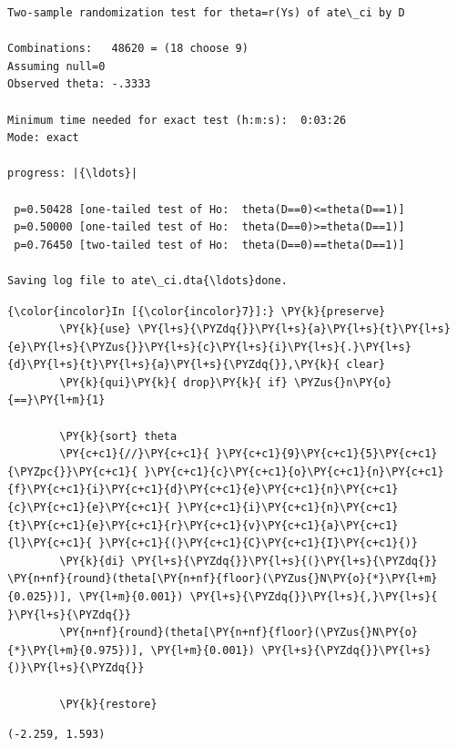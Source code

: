 \documentclass[11pt,notitlepage]{article}\usepackage[]{graphicx}\usepackage[]{color}
\makeatletter
\newenvironment{kframe}{%
 \def\at@end@of@kframe{}%
 \ifinner\ifhmode%
  \def\at@end@of@kframe{\end{minipage}}%
  \begin{minipage}{\columnwidth}%
 \fi\fi%
 \def\FrameCommand##1{\hskip\@totalleftmargin \hskip-\fboxsep
 \colorbox{shadecolor}{##1}\hskip-\fboxsep
     \hskip-\linewidth \hskip-\@totalleftmargin \hskip\columnwidth}%
 \MakeFramed {\advance\hsize-\width
   \@totalleftmargin\z@ \linewidth\hsize
   \@setminipage}}%
 {\par\unskip\endMakeFramed%
 \at@end@of@kframe}
\newenvironment{knitrout}{}{} %
\makeatother
\begin{document}
\begin{enumerate}[a)]
\begin{knitrout}
\begin{kframe}
    \begin{Verbatim}[commandchars=\\\{\}]
Two-sample randomization test for theta=r(Ys) of ate\_ci by D

Combinations:   48620 = (18 choose 9)
Assuming null=0
Observed theta: -.3333

Minimum time needed for exact test (h:m:s):  0:03:26
Mode: exact

progress: |{\ldots}|

 p=0.50428 [one-tailed test of Ho:  theta(D==0)<=theta(D==1)]
 p=0.50000 [one-tailed test of Ho:  theta(D==0)>=theta(D==1)]
 p=0.76450 [two-tailed test of Ho:  theta(D==0)==theta(D==1)]

Saving log file to ate\_ci.dta{\ldots}done.

    \end{Verbatim}

    \begin{Verbatim}[commandchars=\\\{\}]
{\color{incolor}In [{\color{incolor}7}]:} \PY{k}{preserve}
        \PY{k}{use} \PY{l+s}{\PYZdq{}}\PY{l+s}{a}\PY{l+s}{t}\PY{l+s}{e}\PY{l+s}{\PYZus{}}\PY{l+s}{c}\PY{l+s}{i}\PY{l+s}{.}\PY{l+s}{d}\PY{l+s}{t}\PY{l+s}{a}\PY{l+s}{\PYZdq{}},\PY{k}{ clear}
        \PY{k}{qui}\PY{k}{ drop}\PY{k}{ if} \PYZus{}n\PY{o}{==}\PY{l+m}{1}
        
        \PY{k}{sort} theta
        \PY{c+c1}{//}\PY{c+c1}{ }\PY{c+c1}{9}\PY{c+c1}{5}\PY{c+c1}{\PYZpc{}}\PY{c+c1}{ }\PY{c+c1}{c}\PY{c+c1}{o}\PY{c+c1}{n}\PY{c+c1}{f}\PY{c+c1}{i}\PY{c+c1}{d}\PY{c+c1}{e}\PY{c+c1}{n}\PY{c+c1}{c}\PY{c+c1}{e}\PY{c+c1}{ }\PY{c+c1}{i}\PY{c+c1}{n}\PY{c+c1}{t}\PY{c+c1}{e}\PY{c+c1}{r}\PY{c+c1}{v}\PY{c+c1}{a}\PY{c+c1}{l}\PY{c+c1}{ }\PY{c+c1}{(}\PY{c+c1}{C}\PY{c+c1}{I}\PY{c+c1}{)}
        \PY{k}{di} \PY{l+s}{\PYZdq{}}\PY{l+s}{(}\PY{l+s}{\PYZdq{}} \PY{n+nf}{round}(theta[\PY{n+nf}{floor}(\PYZus{}N\PY{o}{*}\PY{l+m}{0.025})], \PY{l+m}{0.001}) \PY{l+s}{\PYZdq{}}\PY{l+s}{,}\PY{l+s}{ }\PY{l+s}{\PYZdq{}}
        \PY{n+nf}{round}(theta[\PY{n+nf}{floor}(\PYZus{}N\PY{o}{*}\PY{l+m}{0.975})], \PY{l+m}{0.001}) \PY{l+s}{\PYZdq{}}\PY{l+s}{)}\PY{l+s}{\PYZdq{}}
        
        \PY{k}{restore}
\end{Verbatim}

    \begin{Verbatim}[commandchars=\\\{\}]
(-2.259, 1.593)
    \end{Verbatim}

\end{kframe}
\end{knitrout}


\end{enumerate}
\end{document}
